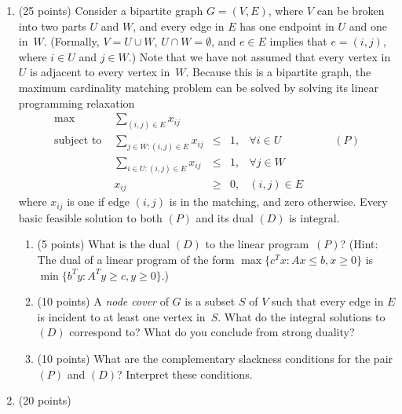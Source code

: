 \begin{enumerate}
  \item (25 points)
    Consider a bipartite graph $G=(V,E)$, where $V$ can be broken into
    two parts $U$ and $W$, and every edge in $E$ has one endpoint in $U$
    and one in~$W$.
    (Formally, $V=U\cup W$, $U\cap W =\emptyset$, and $e \in E$ implies that
    $e=(i,j)$, where $i\in U$ and $j\in W$.)
    Note that we have not assumed %
    that every vertex in $U$ is adjacent to every vertex in~$W$.
    Because this is a bipartite graph, the maximum cardinality matching
    problem can be solved by solving its linear programming relaxation
    \begin{displaymath}
      \begin{array}{lrcllr}
        \max & \sum_{(i,j) \in E} x_{ij} \\
        \mbox{subject to } & \sum_{j \in W: (i,j) \in E} x_{ij}
                                & \leq & 1, & \forall i \in U & \qquad (P) \\
                           & \sum_{i \in U: (i,j) \in E} x_{ij}
                                & \leq & 1, & \forall j \in W \\
                           & x_{ij} & \geq & 0, & (i,j) \in E
      \end{array}
    \end{displaymath}
    where $x_{ij}$ is one if edge $(i,j)$ is in the matching,
    and zero otherwise.
    Every basic feasible solution to both $(P)$ and its dual $(D)$ is integral.
    \begin{enumerate}
      \item (5 points)
        What is the dual $(D)$ to the linear program~$(P)$?
        (Hint: The dual of a linear program of the form
        $\max\{c^Tx:Ax\leq b,x\geq 0\}$ is $\min\{b^Ty:A^Ty\geq c, y\geq 0\}$.)
      \item (10 points)
        A {\em node cover} of $G$ is a subset $S$ of $V$ such that every
        edge in $E$ is incident to at least one vertex in~$S$.
        What do the integral solutions to $(D)$ correspond to?
        What do you conclude from strong duality?
      \item (10 points)
        What are the complementary slackness conditions for the
        pair $(P)$ and $(D)$? Interpret these conditions.
    \end{enumerate}
  \item (20 points)
    \begin{enumerate}

\end{enumerate}
\end{enumerate}

